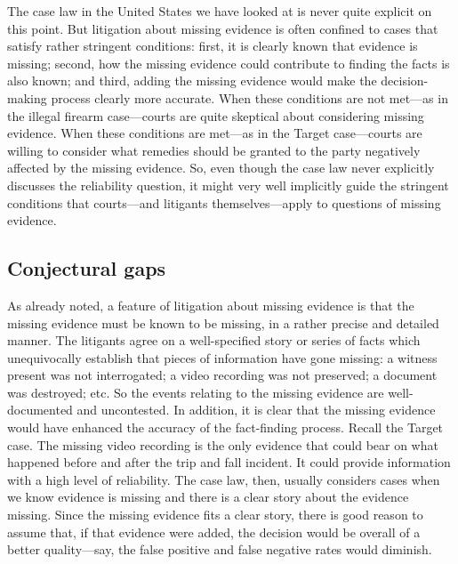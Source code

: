 \documentclass[
  10pt,
  dvipsnames,enabledeprecatedfontcommands]{scrartcl}
\begin{document}
The case law in the United States we have looked at is never quite
explicit on this point. But litigation about missing evidence is often
confined to cases that satisfy rather stringent conditions: first, it is
clearly known that evidence is missing; second, how the missing evidence
could contribute to finding the facts is also known; and third, adding
the missing evidence would make the decision-making process clearly more
accurate. When these conditions are not met---as in the illegal firearm
case---courts are quite skeptical about considering missing evidence.
When these conditions are met---as in the Target case---courts are
willing to consider what remedies should be granted to the party
negatively affected by the missing evidence. So, even though the case
law never explicitly discusses the reliability question, it might very
well implicitly guide the stringent conditions that courts---and
litigants themselves---apply to questions of missing evidence.

\hypertarget{conjectural-gaps}{%
\subsection{Conjectural gaps}\label{conjectural-gaps}}

As already noted, a feature of litigation about missing evidence is that
the missing evidence must be known to be missing, in a rather precise
and detailed manner. The litigants agree on a well-specified story or
series of facts which unequivocally establish that pieces of information
have gone missing: a witness present was not interrogated; a video
recording was not preserved; a document was destroyed; etc. So the
events relating to the missing evidence are well-documented and
uncontested. In addition, it is clear that the missing evidence would
have enhanced the accuracy of the fact-finding process. Recall the
Target case. The missing video recording is the only evidence that could
bear on what happened before and after the trip and fall incident. It
could provide information with a high level of reliability. The case
law, then, usually considers cases when we know evidence is missing and
there is a clear story about the evidence missing. Since the missing
evidence fits a clear story, there is good reason to assume that, if
that evidence were added, the decision would be overall of a better
quality---say, the false positive and false negative rates would
diminish.
\end{document}
